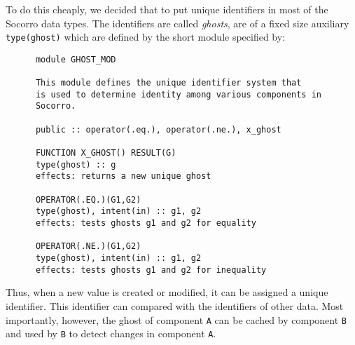 To do this cheaply, we decided that to put unique identifiers in most
of the Socorro data types.  The identifiers are called {\em ghosts},
are of a fixed size auxiliary \verb+type(ghost)+ which are defined
by the short module specified by:

\begin{verbatim}
      module GHOST_MOD

      This module defines the unique identifier system that
      is used to determine identity among various components in
      Socorro.

      public :: operator(.eq.), operator(.ne.), x_ghost

      FUNCTION X_GHOST() RESULT(G)
      type(ghost) :: g
      effects: returns a new unique ghost

      OPERATOR(.EQ.)(G1,G2)
      type(ghost), intent(in) :: g1, g2
      effects: tests ghosts g1 and g2 for equality

      OPERATOR(.NE.)(G1,G2)
      type(ghost), intent(in) :: g1, g2
      effects: tests ghosts g1 and g2 for inequality

\end{verbatim}

Thus, when a new value is created or modified, it can be assigned a
unique identifier.  This identifier can compared with the identifiers
of other data.  Most importantly, however, the ghost of component
\verb+A+ can be cached by component \verb+B+ and used by
\verb+B+ to detect changes in component \verb+A+.

